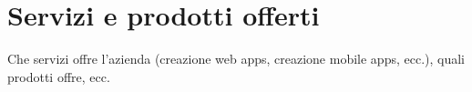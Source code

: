 \section{Servizi e prodotti offerti}
\label{sez:servizi-prodotti-offerti}

Che servizi offre l'azienda (creazione web apps, creazione mobile apps, ecc.), quali prodotti offre, ecc.\\